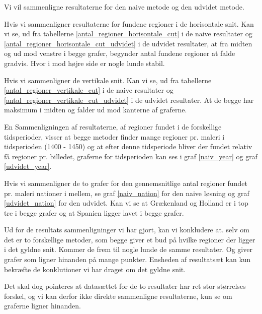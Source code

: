 {
{\sffamily Vi vil sammenligne resultaterne for den naive metode og den udvidet metode.
}


Hvis vi sammenligner resultaterne for fundene regioner i de horisontale
snit. Kan vi se, ud fra tabellerne \ref{antal_regioner_horisontale_cut} i
de naive resultater og \ref{antal_regioner_horisontale_cut_udvidet} i de udvidet
resultater, at fra midten og ud mod venstre i begge grafer, begynder
antal fundene regioner at falde gradvis. Hvor i mod højre side er nogle
lunde stabil.

Hvis vi sammenligner de vertikale snit. Kan vi se, ud fra tabellerne
\ref{antal_regioner_vertikale_cut} i de naive resultater og
\ref{antal_regioner_vertikale_cut_udvidet} i de udvidet resultater. At de begge
har maksimum i midten og falder ud mod kanterne af graferne.

En Sammenligningen af resultaterne, af regioner fundet i de forskellige
tidsperioder, visser at begge metoder finder mange regioner pr. maleri i
tidsperioden (1400 - 1450) og at efter denne tidsperiode bliver der
fundet relativ få regioner pr. billedet, graferne for tidsperioden kan
ses i graf \ref{naiv_year} og graf \ref{udvidet_year}.

Hvis vi sammenligner de to grafer for den gennemsnitlige antal regioner
fundet pr. maleri nationer i mellem, se graf \ref{naiv_nation} for den
naive løsning og graf \ref{udvidet_nation} for den udvidet. Kan vi se at
Grækenland og Holland er i top tre i begge grafer og at Spanien ligger
lavet i begge grafer. 

Ud for de resultats sammenligninger vi har gjort, kan vi konkludere at.
selv om det er to forskellige metoder, som begge giver et bud på hvilke
regioner der ligger i det gyldne snit. Kommer de frem til nogle lunde de
samme resultater. Og giver grafer som ligner hinanden på mange punkter.
Ensheden af resultatsæt kan kun bekræfte de konklutioner vi har draget
om det gyldne snit.

Det skal dog pointeres at datasættet for de to resultater har ret stor
størrelses forskel, og vi kan derfor ikke direkte sammenligne
resultaterne, kun se om graferne ligner hinanden. 
}
